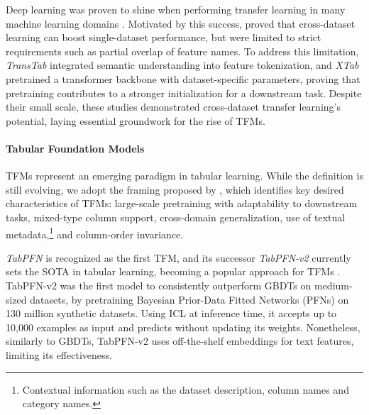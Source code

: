 \documentclass{article}
\begin{document}
Deep learning was proven to shine when performing transfer learning in many machine learning domains \cite{zhuang_comprehensive_2021}. Motivated by this success, \cite{levin_transfer_2022, zhou_unlocking_2023} proved that cross-dataset learning can boost single-dataset performance, but were limited to strict requirements such as partial overlap of feature names. To address this limitation, \textit{TransTab} \cite{wang_transtab_2022} integrated semantic understanding into feature tokenization, and \textit{XTab} \cite{zhu_xtab_2023} pretrained a transformer backbone with dataset-specific parameters, proving that pretraining contributes to a stronger initialization for a downstream task. Despite their small scale, these studies demonstrated cross-dataset transfer learning’s potential, laying essential groundwork for the rise of TFMs.

\paragraph{Tabular Foundation Models} TFMs represent an emerging paradigm in tabular learning. While the definition is still evolving, we adopt the framing proposed by \cite{van_breugel_position_2024}, which identifies key desired characteristics of TFMs: large-scale pretraining with adaptability to downstream tasks, mixed-type column support, cross-domain generalization, use of textual metadata,\footnote{Contextual information such as the dataset description, column names and category names.} and column-order invariance. 

\textit{TabPFN} \cite{hollmann_tabpfn_2022} is recognized as the first TFM, and its successor \textit{TabPFN-v2} \cite{hollmann_accurate_2025} currently sets the SOTA in tabular learning, becoming a popular approach for TFMs \cite{qu_tabicl_2025, feuer_tunetables_2024}. TabPFN-v2 was the first model to consistently outperform GBDTs on medium-sized datasets, by pretraining Bayesian Prior-Data Fitted Networks (PFNs) \cite{muller_transformers_2021} on 130 million synthetic datasets. Using ICL at inference time, it accepts up to 10,000 examples as input and predicts without updating its weights. Nonetheless, similarly to GBDTs, TabPFN-v2 uses off-the-shelf embeddings for text features, limiting its effectiveness.
\end{document}
